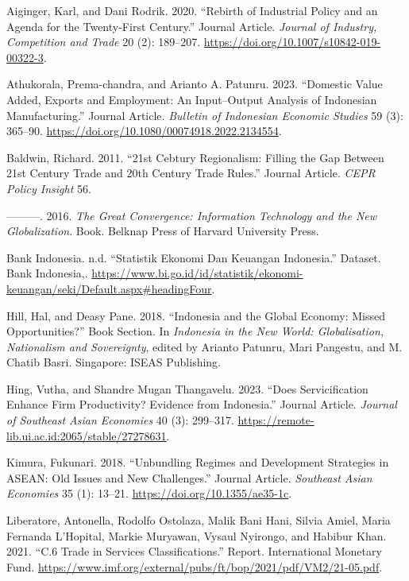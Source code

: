 \documentclass[
  letterpaper,
  DIV=11,
  numbers=noendperiod]{scrartcl}
\newlength{\cslhangindent}
\newenvironment{CSLReferences}[2] %
 {\begin{list}{}{%
  \setlength{\itemindent}{0pt}
  \setlength{\leftmargin}{0pt}
  \setlength{\parsep}{0pt}
  \ifodd #1
   \setlength{\leftmargin}{\cslhangindent}
   \setlength{\itemindent}{-1\cslhangindent}
  \fi
  \setlength{\itemsep}{#2\baselineskip}}}
 {\end{list}}
\begin{document}
\label{refs}
\begin{CSLReferences}{1}{0}
Aiginger, Karl, and Dani Rodrik. 2020. {``Rebirth of Industrial Policy
and an Agenda for the Twenty-First Century.''} Journal Article.
\emph{Journal of Industry, Competition and Trade} 20 (2): 189--207.
\url{https://doi.org/10.1007/s10842-019-00322-3}.

Athukorala, Prema-chandra, and Arianto A. Patunru. 2023. {``Domestic
Value Added, Exports and Employment: An Input--Output Analysis of
Indonesian Manufacturing.''} Journal Article. \emph{Bulletin of
Indonesian Economic Studies} 59 (3): 365--90.
\url{https://doi.org/10.1080/00074918.2022.2134554}.

Baldwin, Richard. 2011. {``21st Cebtury Regionalism: Filling the Gap
Between 21st Century Trade and 20th Century Trade Rules.''} Journal
Article. \emph{CEPR Policy Insight} 56.

---------. 2016. \emph{The Great Convergence: Information Technology and
the New Globalization}. Book. Belknap Press of Harvard University Press.

Bank Indonesia. n.d. {``Statistik Ekonomi Dan Keuangan Indonesia.''}
Dataset. Bank Indonesia,.
\url{https://www.bi.go.id/id/statistik/ekonomi-keuangan/seki/Default.aspx\#headingFour}.

Hill, Hal, and Deasy Pane. 2018. {``Indonesia and the Global Economy:
Missed Opportunities?''} Book Section. In \emph{Indonesia in the New
World: Globalisation, Nationalism and Sovereignty}, edited by Arianto
Patunru, Mari Pangestu, and M. Chatib Basri. Singapore: ISEAS
Publishing.

Hing, Vutha, and Shandre Mugan Thangavelu. 2023. {``Does Servicification
Enhance Firm Productivity? Evidence from Indonesia.''} Journal Article.
\emph{Journal of Southeast Asian Economies} 40 (3): 299--317.
\url{https://remote-lib.ui.ac.id:2065/stable/27278631}.

Kimura, Fukunari. 2018. {``Unbundling Regimes and Development Strategies
in ASEAN: Old Issues and New Challenges.''} Journal Article.
\emph{Southeast Asian Economies} 35 (1): 13--21.
\url{https://doi.org/10.1355/ae35-1c}.

Liberatore, Antonella, Rodolfo Ostolaza, Malik Bani Hani, Silvia Amiel,
Maria Fernanda L'Hopital, Markie Muryawan, Vysaul Nyirongo, and Habibur
Khan. 2021. {``C.6 Trade in Services Classifications.''} Report.
International Monetary Fund.
\url{https://www.imf.org/external/pubs/ft/bop/2021/pdf/VM2/21-05.pdf}.


\end{CSLReferences}
\end{document}
